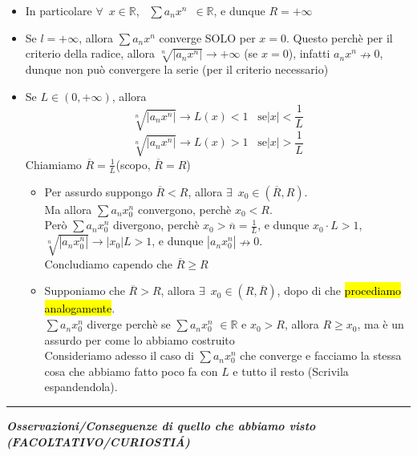 \documentclass{article}
\theoremstyle{definition}
\newcommand{\linea}{\vspace{15pt}\hrule\vspace{15pt}}
\newcommand{\R}{\mathbb{R}}
\begin{document}
\begin{itemize}
\item In particolare $\forall \,\,\, x \in \R$, $\,\,\, \sum a_nx^n \,\,\, \in \R$, e dunque $R=+\infty$
\item Se $l=+\infty$, allora $\sum a_nx^n$ converge SOLO per $x=0$. Questo perchè per il criterio della radice, allora $\sqrt[n]{|a_nx^n|} \to +\infty$ (se $x=0$), infatti $a_nx^n \nrightarrow 0$, dunque non può convergere la serie (per il criterio necessario)
\item Se $L \in (0, +\infty)$, allora
\begin{equation}
    \sqrt[n]{|a_nx^n|} \to L(x) < 1 \,\,\,\,\, \mbox{se} |x|<\frac{1}{L}
\end{equation}
\begin{equation}
    \sqrt[n]{|a_nx^n|} \to L(x) > 1 \,\,\,\,\, \mbox{se} |x|>\frac{1}{L}
\end{equation}
Chiamiamo $\overline{R}=\frac{1}{L}$(scopo, $\overline{R}=R$)
\begin{itemize}
    \item Per assurdo suppongo $\overline{R}<R$, allora $\exists \,\,\, x_0 \in (\overline{R},R)$.\\
    Ma allora $\sum a_nx_0^n$ convergono, perchè $x_0 < R$.\\
    Però $\sum a_nx_0^n$ divergono, perchè $x_0 > \overline{n}=\frac{1}{L}$, e dunque $x_0 \cdot L > 1$, $ \sqrt[n]{|a_nx_0^n|} \to |x_0|L > 1$, e dunque $|a_nx_0^n| \nrightarrow 0$.
    \\
    Concludiamo capendo che $\overline{R} \geqslant R$
    \item Supponiamo che $\overline{R} > R$, allora $\exists \,\,\, x_0 \in (R, \overline{R})$, dopo di che \hl{procediamo analogamente}.
    \\
    $\sum a_nx_0^n$ diverge perchè se $\sum a_nx_0^n$ $\in \R$ e $x_0 > R$, allora $R \geqslant x_0$, ma è un assurdo per come lo abbiamo costruito
    \\
    Consideriamo adesso il caso di $\sum a_nx_0^n$ che converge e facciamo la stessa cosa che abbiamo fatto poco fa con $L$ e tutto il resto (Scrivila espandendola).
\end{itemize}
\end{itemize}
\linea
\begin{center}
    \textbf{\textit{Osservazioni/Conseguenze di quello che abbiamo visto (FACOLTATIVO/CURIOSTI\'A)}}
\end{center}
\end{document}
